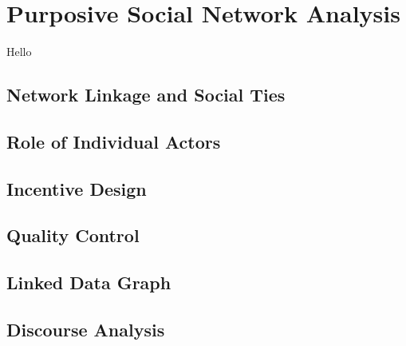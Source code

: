 

\chapter{Purposive Social Network Analysis} \label{Chapter:Purposive Social Network Analysis}
Hello

\section{Network Linkage and Social Ties}
\section{Role of Individual Actors}
\section{Incentive Design}
\section{Quality Control}
\section{Linked Data Graph}
\section{Discourse Analysis}
